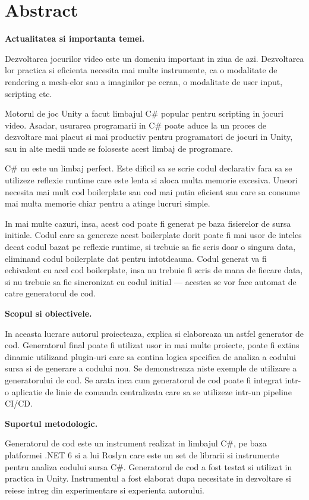\documentclass{report}
\begin{document}
\chapter*{Abstract}

\textbf{Actualitatea si importanta temei.}

Dezvoltarea jocurilor video este un domeniu important in ziua de azi.
Dezvoltarea lor practica si eficienta necesita mai multe instrumente, ca
o modalitate de rendering a mesh-elor sau a imaginilor pe ecran, o
modalitate de user input, scripting etc.

Motorul de joc Unity a facut limbajul C\# popular pentru scripting in
jocuri video. Asadar, usurarea programarii in C\# poate aduce la un
proces de dezvoltare mai placut si mai productiv pentru programatori de
jocuri in Unity, sau in alte medii unde se foloseste acest limbaj de
programare.

C\# nu este un limbaj perfect. Este dificil sa se scrie codul declarativ
fara sa se utilizeze reflexie runtime care este lenta si aloca multa
memorie excesiva. Uneori necesita mai mult cod boilerplate sau cod mai
putin eficient sau care sa consume mai multa memorie chiar pentru a
atinge lucruri simple.

In mai multe cazuri, insa, acest cod poate fi generat pe baza fisierelor
de sursa initiale. Codul care sa genereze acest boilerplate dorit poate
fi mai usor de inteles decat codul bazat pe reflexie runtime, si trebuie
sa fie scris doar o singura data, eliminand codul boilerplate dat pentru
intotdeauna. Codul generat va fi echivalent cu acel cod boilerplate,
insa nu trebuie fi scris de mana de fiecare data, si nu trebuie sa fie
sincronizat cu codul initial --- acestea se vor face automat de catre
generatorul de cod.

\textbf{Scopul si obiectivele.}

In aceasta lucrare autorul proiecteaza, explica si elaboreaza un astfel
generator de cod. Generatorul final poate fi utilizat usor in mai multe
proiecte, poate fi extins dinamic utilizand plugin-uri care sa contina
logica specifica de analiza a codului sursa si de generare a codului
nou. Se demonstreaza niste exemple de utilizare a generatorului de cod.
Se arata inca cum generatorul de cod poate fi integrat intr-o aplicatie
de linie de comanda centralizata care sa se utilizeze intr-un pipeline
CI/CD.

\textbf{Suportul metodologic.}

Generatorul de cod este un instrument realizat in limbajul C\#, pe baza
platformei .NET 6 si a lui Roslyn care este un set de librarii si
instrumente pentru analiza codului sursa C\#. Generatorul de cod a fost
testat si utilizat in practica in Unity. Instrumentul a fost elaborat
dupa necesitate in dezvoltare si reiese intreg din experimentare si
experienta autorului.
\end{document}
